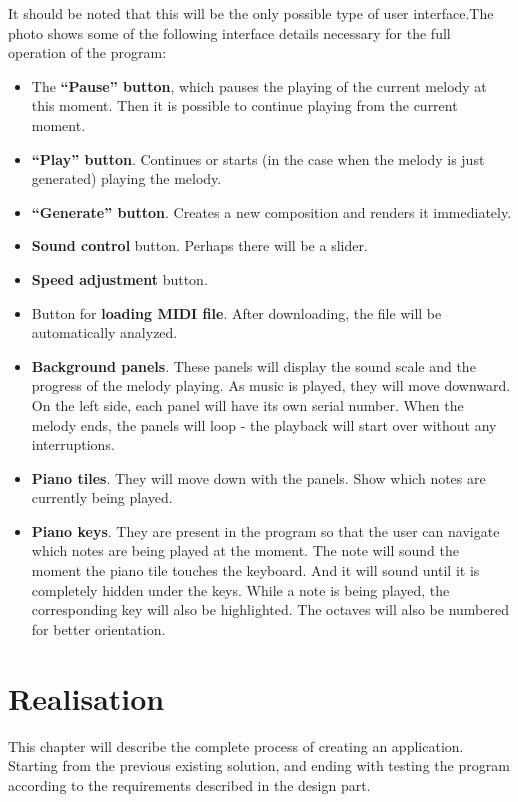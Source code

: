 \documentclass[thesis=B,english]{FITthesis}[2019/12/23]
\begin{document}
It should be noted that this will be the only possible type of user interface.The photo shows some of the following interface details necessary for the full operation of the program:

\clearpage
\begin{itemize}
   \item The \textbf{“Pause” button}, which pauses the playing of the current melody at this moment. Then it is possible to continue playing from the current moment.
   \item \textbf{“Play” button}. Continues or starts (in the case when the melody is just generated) playing the melody.
   \item \textbf{“Generate” button}. Creates a new composition and renders it immediately.
   \item \textbf{Sound control} button. Perhaps there will be a slider.
   \item \textbf{Speed adjustment} button.
   \item Button for \textbf{loading MIDI file}. After downloading, the file will be automatically analyzed.
   \item \textbf{Background panels}. These panels will display the sound scale and the progress of the melody playing. As music is played, they will move downward. On the left side, each panel will have its own serial number. When the melody ends, the panels will loop - the playback will start over without any interruptions.
   \item \textbf{Piano tiles}. They will move down with the panels. Show which notes are currently being played.
   \item \textbf{Piano keys}. They are present in the program so that the user can navigate which notes are being played at the moment. The note will sound the moment the piano tile touches the keyboard. And it will sound until it is completely hidden under the keys. While a note is being played, the corresponding key will also be highlighted. The octaves will also be numbered for better orientation.
\end{itemize}

\chapter{Realisation}

This chapter will describe the complete process of creating an application. Starting from the previous existing solution, and ending with testing the program according to the requirements described in the design part.
\end{document}
